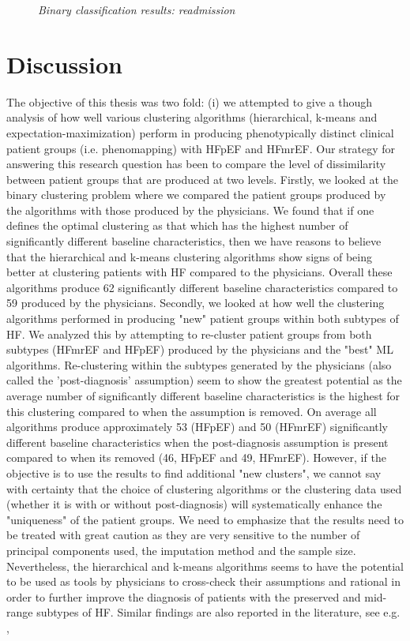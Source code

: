 \documentclass[../thesis.tex]{subfiles}
\begin{document}
\begin{figure}[th!]
    \centering
    \scalebox{.8}{}
    \caption[Binary classification results: readmission]{\textit{Binary classification results: readmission}}
    \label{fig:bi_class_read}
\end{figure}

\section{Discussion}

\noindent The objective of this thesis was two fold: (i) we attempted to give a though analysis of how well various clustering algorithms (hierarchical, k-means and expectation-maximization) perform in producing phenotypically distinct clinical patient groups (i.e. phenomapping) with HFpEF and HFmrEF. Our strategy for answering this research question has been to compare the level of dissimilarity between patient groups that are produced at two levels. Firstly, we looked at the binary clustering problem where we compared the patient groups produced by the algorithms with those produced by the physicians. We found that if one defines the optimal clustering as that which has the highest number of significantly different baseline characteristics, then we have reasons to believe that the hierarchical and k-means clustering algorithms show signs of being better at clustering patients with HF compared to the physicians. Overall these algorithms produce 62 significantly different baseline characteristics compared to 59 produced by the physicians. Secondly, we looked at how well the clustering algorithms performed in producing "new" patient groups within both subtypes of HF. We analyzed this by attempting to re-cluster patient groups from both subtypes (HFmrEF and HFpEF) produced by the physicians and the "best" ML algorithms. Re-clustering within the subtypes generated by the physicians (also called the 'post-diagnosis' assumption) seem to show the greatest potential as the average number of significantly different baseline characteristics is the highest for this clustering compared to when the assumption is removed. On average all algorithms produce approximately 53 (HFpEF) and 50 (HFmrEF) significantly different baseline characteristics when the post-diagnosis assumption is present compared to when its removed (46, HFpEF and 49, HFmrEF). However, if the objective is to use the results to find additional "new clusters", we cannot say with certainty that the choice of clustering algorithms or the clustering data used (whether it is with or without post-diagnosis) will systematically enhance the "uniqueness" of the patient groups. We need to emphasize that the results need to be treated with great caution as they are very sensitive to the number of principal components used, the imputation method and the sample size. Nevertheless, the hierarchical and k-means algorithms seems to have the potential to be used as tools by physicians to cross-check their assumptions and rational in order to further improve the diagnosis of patients with the preserved and mid-range subtypes of HF. Similar findings are also reported in the literature, see e.g. \cite{shah2014phenomapping}, 
\end{document}
